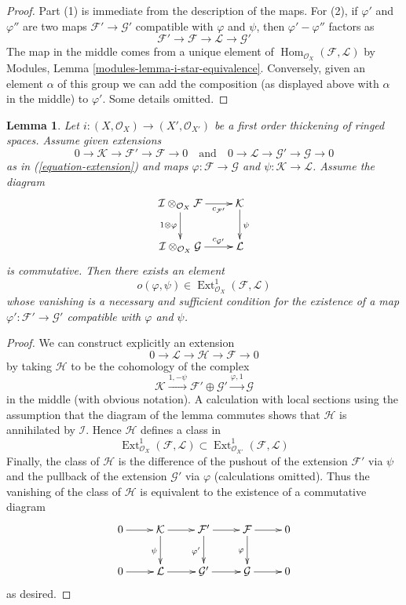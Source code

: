 \documentclass{stacks-project}
\theoremstyle{plain}
\newtheorem{lemma}[subsection]{Lemma}
\theoremstyle{definition}
\theoremstyle{remark}
\numberwithin{equation}{subsection}
\def\Hom{\mathop{\mathrm{Hom}}\nolimits}
\def\Ext{\mathop{\mathrm{Ext}}\nolimits}
\begin{document}
\begin{proof}
Part (1) is immediate from the description of the maps.
For (2), if $\varphi'$ and $\varphi''$ are two maps
$\mathcal{F}' \to \mathcal{G}'$ compatible with $\varphi$
and $\psi$, then $\varphi' - \varphi''$ factors as
$$
\mathcal{F}' \to \mathcal{F} \to \mathcal{L} \to \mathcal{G}'
$$
The map in the middle comes from a unique element of
$\Hom_{\mathcal{O}_X}(\mathcal{F}, \mathcal{L})$ by
Modules, Lemma \ref{modules-lemma-i-star-equivalence}.
Conversely, given an element $\alpha$ of this group we can add the
composition (as displayed above with $\alpha$ in the middle)
to $\varphi'$. Some details omitted.
\end{proof}

\begin{lemma}
\label{lemma-inf-obs-map}
Let $i : (X, \mathcal{O}_X) \to (X', \mathcal{O}_{X'})$
be a first order thickening of ringed spaces. Assume given
extensions
$$
0 \to \mathcal{K} \to \mathcal{F}' \to \mathcal{F} \to 0
\quad\text{and}\quad
0 \to \mathcal{L} \to \mathcal{G}' \to \mathcal{G} \to 0
$$
as in (\ref{equation-extension})
and maps $\varphi : \mathcal{F} \to \mathcal{G}$ and
$\psi : \mathcal{K} \to \mathcal{L}$. Assume the diagram
$$
\xymatrix{
\mathcal{I} \otimes_{\mathcal{O}_X} \mathcal{F}
\ar[r]_-{c_{\mathcal{F}'}} \ar[d]_{1 \otimes \varphi} &
\mathcal{K} \ar[d]^\psi \\
\mathcal{I} \otimes_{\mathcal{O}_X} \mathcal{G}
\ar[r]^-{c_{\mathcal{G}'}} &
\mathcal{L}
}
$$
is commutative. Then there exists an element
$$
o(\varphi, \psi) \in
\Ext^1_{\mathcal{O}_X}(\mathcal{F}, \mathcal{L})
$$
whose vanishing is a necessary and sufficient condition for the existence
of a map $\varphi' : \mathcal{F}' \to \mathcal{G}'$ compatible with
$\varphi$ and $\psi$.
\end{lemma}

\begin{proof}
We can construct explicitly an extension
$$
0 \to \mathcal{L} \to \mathcal{H} \to \mathcal{F} \to 0
$$
by taking $\mathcal{H}$ to be the cohomology of the complex
$$
\mathcal{K}
\xrightarrow{1, - \psi}
\mathcal{F}' \oplus \mathcal{G}' \xrightarrow{\varphi, 1}
\mathcal{G}
$$
in the middle (with obvious notation). A calculation with local sections
using the assumption that the diagram of the lemma commutes
shows that $\mathcal{H}$ is annihilated by $\mathcal{I}$. Hence
$\mathcal{H}$ defines a class in
$$
\Ext^1_{\mathcal{O}_X}(\mathcal{F}, \mathcal{L})
\subset
\Ext^1_{\mathcal{O}_{X'}}(\mathcal{F}, \mathcal{L})
$$
Finally, the class of $\mathcal{H}$ is the difference of the pushout
of the extension $\mathcal{F}'$ via $\psi$ and the pullback
of the extension $\mathcal{G}'$ via $\varphi$ (calculations omitted).
Thus the vanishing of the class of $\mathcal{H}$ is equivalent to the
existence of a commutative diagram
$$
\xymatrix{
0 \ar[r] &
\mathcal{K} \ar[r] \ar[d]_{\psi} &
\mathcal{F}' \ar[r] \ar[d]_{\varphi'} &
\mathcal{F} \ar[r] \ar[d]_\varphi & 0\\
0 \ar[r] &
\mathcal{L} \ar[r] &
\mathcal{G}' \ar[r] &
\mathcal{G} \ar[r] & 0
}
$$
as desired.
\end{proof}
\end{document}
